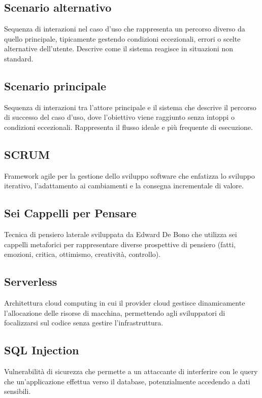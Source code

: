 \documentclass[a4paper,11pt]{article}
\begin{document}
\subsection{Scenario alternativo}
Sequenza di interazioni nel caso d'uso che rappresenta un percorso diverso da quello principale, tipicamente gestendo condizioni eccezionali, errori o scelte alternative dell'utente. Descrive come il sistema reagisce in situazioni non standard.

\subsection{Scenario principale}
Sequenza di interazioni tra l'attore principale e il sistema che descrive il percorso di successo del caso d'uso, dove l'obiettivo viene raggiunto senza intoppi o condizioni eccezionali. Rappresenta il flusso ideale e più frequente di esecuzione.

\subsection{SCRUM}
Framework agile per la gestione dello sviluppo software che enfatizza lo sviluppo iterativo, l'adattamento ai cambiamenti e la consegna incrementale di valore.

\subsection{Sei Cappelli per Pensare}
Tecnica di pensiero laterale sviluppata da Edward De Bono che utilizza sei cappelli metaforici per rappresentare diverse prospettive di pensiero (fatti, emozioni, critica, ottimismo, creatività, controllo).

\subsection{Serverless}
Architettura cloud computing in cui il provider cloud gestisce dinamicamente l'allocazione delle risorse di macchina, permettendo agli sviluppatori di focalizzarsi sul codice senza gestire l'infrastruttura.

\subsection{SQL Injection}
Vulnerabilità di sicurezza che permette a un attaccante di interferire con le query che un'applicazione effettua verso il database, potenzialmente accedendo a dati sensibili.
\end{document}
